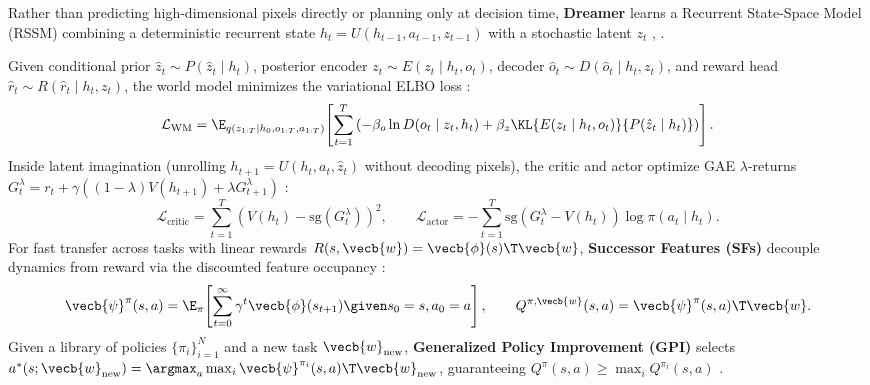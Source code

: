 \documentclass[../../../../master.tex]{subfiles}
\begin{document}
Rather than predicting high-dimensional pixels directly or planning only at decision time, \textbf{Dreamer} learns a Recurrent State-Space Model (RSSM) combining a deterministic recurrent state $h_t = U(h_{t-1}, a_{t-1}, z_{t-1})$ with a stochastic latent $z_t$ , .

\begin{coremath}
Given conditional prior $\hat{z}_t \sim P(\hat{z}_t \mid h_t)$, posterior encoder $z_t \sim E(z_t \mid h_t, o_t)$, decoder $\hat{o}_t \sim D(\hat{o}_t \mid h_t, z_t)$, and reward head $\hat{r}_t \sim R(\hat{r}_t \mid h_t, z_t)$, the world model minimizes the variational ELBO loss :
\begin{equation}
\label{eq:mbrl:dreamer_wm}
\mathcal{L}_{\text{WM}} = \E_{q(z_{1:T} \mid h_0, o_{1:T}, a_{1:T})}\!\left[\sum_{t=1}^T \left( -\beta_o \ln D(o_t \mid z_t, h_t) + \beta_z \KL{E(z_t \mid h_t, o_t)}{P(\hat{z}_t \mid h_t)} \right)\right].
\end{equation}
Inside latent imagination (unrolling $h_{t+1} = U(h_t, a_t, \hat{z}_t)$ without decoding pixels), the critic and actor optimize GAE $\lambda$-returns $G_t^\lambda = r_t + \gamma\left((1-\lambda)V(h_{t+1}) + \lambda G_{t+1}^\lambda\right)$ :
\begin{equation}
\label{eq:mbrl:dreamer_ac}
\mathcal{L}_{\text{critic}} = \sum_{t=1}^T \left(V(h_t) - \mathrm{sg}(G_t^\lambda)\right)^2, \qquad
\mathcal{L}_{\text{actor}} = -\sum_{t=1}^T \mathrm{sg}\!\left(G_t^\lambda - V(h_t)\right)\log \pi(a_t \mid h_t).
\end{equation}
For fast transfer across tasks with linear rewards $R(s, \vecb{w}) = \vecb{\phi}(s)\T \vecb{w}$, \textbf{Successor Features (SFs)} decouple dynamics from reward via the discounted feature occupancy :
\begin{equation}
\label{eq:mbrl:sf_gpi}
\vecb{\psi}^\pi(s, a) = \E_\pi\!\left[\sum_{t=0}^\infty \gamma^t \vecb{\phi}(s_{t+1}) \given s_0=s, a_0=a\right], \qquad
Q^{\pi, \vecb{w}}(s, a) = \vecb{\psi}^\pi(s, a)\T \vecb{w}.
\end{equation}
Given a library of policies $\{\pi_i\}_{i=1}^N$ and a new task $\vecb{w}_{\text{new}}$, \textbf{Generalized Policy Improvement (GPI)} selects $a^*(s; \vecb{w}_{\text{new}}) = \argmax_a \max_i \vecb{\psi}^{\pi_i}(s, a)\T \vecb{w}_{\text{new}}$, guaranteeing $Q^{\pi}(s, a) \ge \max_i Q^{\pi_i}(s, a)$ .
\end{coremath}
\end{document}
